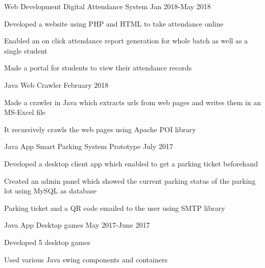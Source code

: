 \begin{cventries}
  \cventry
    {Web Development}
    {Digital Attendance System}
    {}
    {Jan 2018-May 2018}
    {
      \begin{cvitems}
        \item {Developed a website using PHP and HTML to take attendance online}
        \item {Enabled an on click attendance report generation for whole batch as well as a single student }
        \item {Made a portal for students to view their attendance records}
      \end{cvitems}
    }
    \cventry
    {Java}
    {Web Crawler}
     {}
    {February 2018}
    {
      \begin{cvitems}
        \item {Made a crawler in Java which extracts urls from web pages and writes them in an MS-Excel file}
        \item {It recursively crawls the web pages using Apache POI library}
      \end{cvitems}
    }
  
     \cventry
    {Java App}
    {Smart Parking System Prototype}
    {}
    {July 2017}
    {
      \begin{cvitems}
        \item {Developed a desktop client app which enabled to get a parking ticket beforehand}
        \item{Created an admin panel which showed the current parking status of the parking lot using MySQL as database}
        \item {Parking ticket and a QR code emailed to the user using SMTP library }
      \end{cvitems}
    }
    \cventry
    {Java App}
    {Desktop games}
    {}
    {May 2017-June 2017}
    {
      \begin{cvitems}
      \item {Developed 5 desktop games}
      \item {Used various Java swing components and containers}
      \end{cvitems}
    }
    
\end{cventries}
